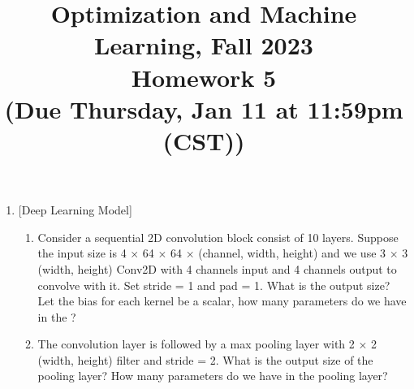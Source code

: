 \documentclass[10pt]{article}
\begin{document}
\date{}
\title{Optimization and Machine Learning, Fall 2023 \\
	Homework 5 \\
	\small (Due Thursday, Jan 11 at 11:59pm (CST))}
\maketitle
\begin{enumerate}[1.]

	\item {} [Deep Learning Model]
	\begin{enumerate}
		\item Consider a sequential 2D convolution block consist of 10 layers. Suppose the input size is 4 $\times$ 64 $\times$ 64 $\times$ (channel, width, height) and
		we use 3 $\times$ 3 (width, height) Conv2D with 4 channels input and 4 channels output to convolve with it. Set stride = 1 and pad = 1. What is the output size? Let the bias for each kernel be a scalar, how many parameters do we have in the ? 
		\item The convolution layer is followed by a max pooling layer with 2 × 2 (width, height) filter and stride
		= 2. What is the output size of the pooling layer? How many parameters do we have in the pooling
		layer? 
	\end{enumerate} \newpage



\end{enumerate}
\end{document}
